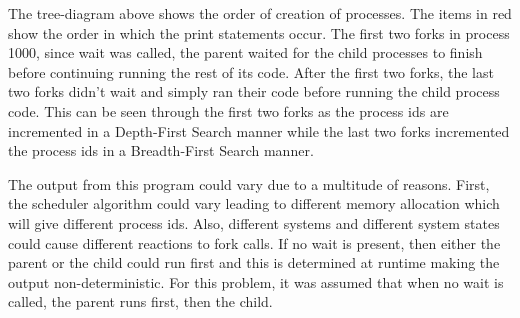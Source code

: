 \documentclass[12pt]{article}
\begin{document}
The tree-diagram above shows the order of creation of processes. The items in red show the order in which the print statements occur. The first two forks in process 1000, since wait was called, the parent waited for the child processes to finish before continuing running the rest of its code. After the first two forks, the last two forks didn't wait and simply ran their code before running the child process code. This can be seen through the first two forks as the process ids are incremented in a Depth-First Search manner while the last two forks incremented the process ids in a Breadth-First Search manner. 

The output from this program could vary due to a multitude of reasons. First, the scheduler algorithm could vary leading to different memory allocation which will give different process ids. Also, different systems and different system states could cause different reactions to fork calls. If no wait is present, then either the parent or the child could run first and this is determined at runtime making the output non-deterministic. For this problem, it was assumed that when no wait is called, the parent runs first, then the child. 
\end{document}
